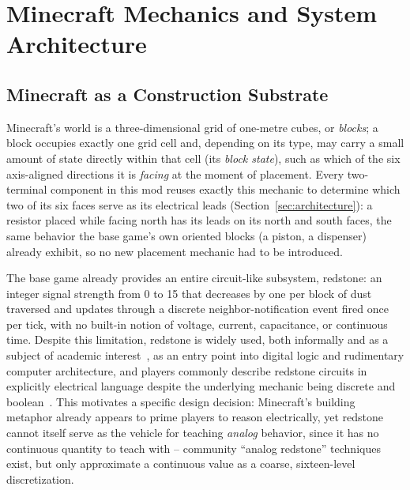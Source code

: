 \section{Minecraft Mechanics and System Architecture}

\subsection{Minecraft as a Construction Substrate}
\label{sec:minecraft-mechanics}

Minecraft's world is a three-dimensional grid of one-metre cubes, or \emph{blocks}; a block
occupies exactly one grid cell and, depending on its type, may carry a small amount of state
directly within that cell (its \emph{block state}), such as which of the six axis-aligned
directions it is \emph{facing} at the moment of placement. Every two-terminal component in
this mod reuses exactly this mechanic to determine which two of its six faces serve as its
electrical leads (Section~\ref{sec:architecture}): a resistor placed while facing north has
its leads on its north and south faces, the same behavior the base game's own oriented blocks
(a piston, a dispenser) already exhibit, so no new placement mechanic had to be introduced.

The base game already provides an entire circuit-like subsystem, redstone: an integer signal
strength from 0 to 15 that decreases by one per block of dust traversed and updates through a
discrete neighbor-notification event fired once per tick, with no built-in notion of voltage,
current, capacitance, or continuous time. Despite this limitation, redstone is widely used,
both informally and as a subject of academic interest~\cite{nebel2016mining}, as an entry
point into digital logic and rudimentary computer architecture, and players commonly describe
redstone circuits in explicitly electrical language despite the underlying mechanic being
discrete and boolean~\cite{dezuanni2015redstone}. This motivates a specific design decision:
Minecraft's building metaphor already appears to prime players to reason electrically, yet
redstone cannot itself serve as the vehicle for teaching \emph{analog} behavior, since it has
no continuous quantity to teach with -- community ``analog redstone'' techniques exist, but
only approximate a continuous value as a coarse, sixteen-level discretization.


